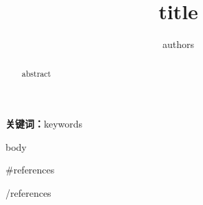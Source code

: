 \documentclass[12pt,a4paper]{ctexart}
\title{ {{title}} }
\author{ {{authors}} }
\date{}
\begin{document}
\maketitle

\begin{abstract}
{{abstract}}
\end{abstract}

\textbf{关键词：}{{keywords}}

{{body}}

{{#references}}


{{/references}}
\end{document}
